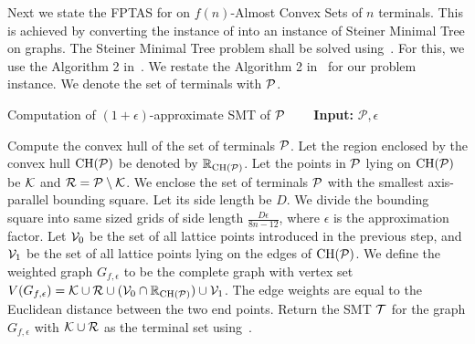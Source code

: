 Next we state the FPTAS for \ESMT on $f(n)$-Almost Convex Sets of $n$  terminals. This is achieved by converting the instance of \ESMT into an instance of {\sc Steiner Minimal Tree} on graphs. The {\sc Steiner Minimal Tree} problem shall be solved using~. For this, we use the Algorithm 2 in~\cite{scott1988convexity}. We restate the Algorithm 2 in~\cite{scott1988convexity} for our problem instance. We denote the set of terminals with $\mathcal{P}$.

\begin{algorithm}[H]
\caption{Computation of $(1+\epsilon)$-approximate SMT of $\mathcal{P}$ ~~~ \textbf{Input:} $\mathcal P, \epsilon$ }\label{alg:smt_fptas}
\begin{algorithmic}[1]
\State Compute the convex hull of the set of terminals $\mathcal{P}$. Let the region enclosed by the convex hull $\mathrm{CH}(\mathcal{P})$ be denoted by $\mathbb{R}_{\mathrm{CH}(\mathcal{P})}$. Let the points in $\mathcal{P}$ lying on $\mathrm{CH}(\mathcal{P})$ be $\mathcal{K}$ and $\mathcal{R} = \mathcal{P} \setminus \mathcal{K}$.
\State We enclose the set of terminals $\mathcal{P}$ with the smallest axis-parallel bounding square. Let its side length be $D$. We divide the bounding square into same sized grids of side length $\frac{D\epsilon}{8n-12}$, where $\epsilon$ is the approximation factor.
\State Let $\mathcal{V}_0$ be the set of all lattice points introduced in the previous step, and $\mathcal{V}_1$ be the set of all lattice points lying on the edges of $\mathrm{CH}(\mathcal{P})$. We define the weighted graph $G_{f,\epsilon}$ to be the complete graph with vertex set $V(G_{f,\epsilon}) = \mathcal{K} \cup \mathcal{R} \cup (\mathcal{V}_0 \cap \mathbb{R}_{\mathrm{CH}(\mathcal{P})}) \cup \mathcal{V}_1$. The edge weights are equal to the Euclidean distance between the two end points.
\State Return the SMT $\mathcal{T}$ for the graph $G_{f,\epsilon}$ with $\mathcal{K} \cup \mathcal{R}$ as the terminal set using~. 
\end{algorithmic}
\end{algorithm}

